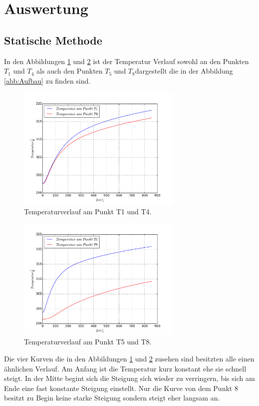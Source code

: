 \section{Auswertung}
\label{sec:Auswertung}
\subsection{Statische Methode}

In den Abbildungen \ref{abb:T1T4} und \ref{abb:T5T8} ist der
Temperatur Verlauf sowohl an den Punkten $T_1$ und $T_4$ als
auch den Punkten $T_5$ und $T_8$dargestellt die in der Abbildung
\ref{abb:Aufbau} zu finden sind.


\begin{figure}
  \centering
  \includegraphics[width=0.7\textwidth]{plotT1T4.pdf}
  \caption{Temperaturverlauf am Punkt T1 und T4.}
  \label{abb:T1T4}
  \end{figure}
\begin{figure}
    \centering
    \includegraphics[width=0.7\textwidth]{plotT5T8.pdf}
    \caption{Temperaturverlauf am Punkt T5 und T8.}
    \label{abb:T5T8}
\end{figure}
Die vier Kurven die in den
Abbildungen \ref{abb:T1T4} und \ref{abb:T5T8}
zusehen sind besitzten alle einen ähnlichen Verlauf.
Am Anfang ist die Temperatur kurz konstant
ehe sie schnell steigt. In der Mitte begint
sich die Steigung sich wieder zu verringern,
bis sich am Ende  eine fast konstante
Steigung einstellt. Nur die Kurve von dem Punkt 8 besitzt
zu Begin keine starke Steigung sondern steigt eher langsam
an.



